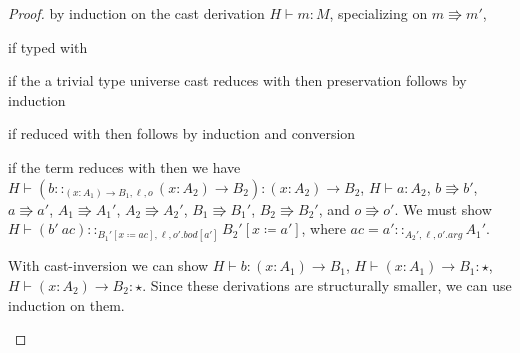 \begin{proof}
 by induction on the cast derivation $H\vdash m:M$, specializing on $m\Rrightarrow m'$,
 
\begin{casenv}
 \item if typed with 
 \begin{casenv}
   \item if the a trivial type universe cast reduces with  then preservation follows by induction
   \item if reduced with  then follows by induction and conversion
 \end{casenv}
 \item {}
 \begin{casenv}
   \item if the term reduces with  then we have
   $H\vdash\left(b::_{\left(x:A_{1}\right)\rightarrow B_{1},\ell ,o}\left(x:A_{2}\right)\rightarrow B_{2}\right):\left(x:A_{2}\right)\rightarrow B_{2}$,
   $H\vdash a:A_{2}$,
   $b\Rrightarrow b'$, $a\Rrightarrow a'$, $A_{1}\Rrightarrow A_{1}'$,
   $A_{2}\Rrightarrow A_{2}'$, $B_{1}\Rrightarrow B_{1}'$,  $B_{2}\Rrightarrow B_{2}'$,
   and $o\Rrightarrow o'$.
   We must show $H\vdash\left(b'\ ac\right)::_{B_{1}'\left[x\coloneqq ac\right],\ell ,o'.bod[a']}B_{2}'\left[x\coloneqq a'\right]$, where $ac=a'::_{A_{2}',\ell,o'.arg}A_{1}'$.
  
   With cast-inversion we can show $H\vdash b:\left(x:A_{1}\right)\rightarrow B_{1}$, $H\vdash\left(x:A_{1}\right)\rightarrow B_{1}:\star$,
   $H\vdash\left(x:A_{2}\right)\rightarrow B_{2}:\star$.
   Since these derivations are structurally smaller, we can use induction on them.
 

\end{casenv}
\end{casenv}
\end{proof}
